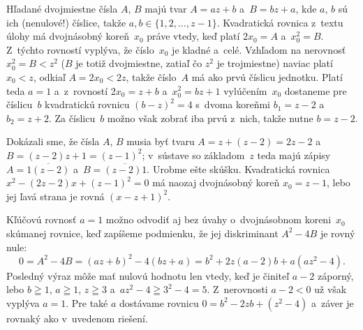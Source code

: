 {%
Hľadané dvojmiestne čísla $A$, $B$ majú tvar $A=az+b$ a~$B=bz+a$,
kde $a$, $b$ sú ich (nenulové!) číslice, takže
$a,b\in\{1,2,\dots,z-1\}$. Kvadratická rovnica z~textu úlohy má
dvojnásobný koreň~$x_0$ práve vtedy, keď platí $2x_0=A$ a~$x_0^2=B$.
Z~týchto rovností vyplýva, že číslo~$x_0$ je kladné a~celé.
Vzhľadom na nerovnosť $x_0^2=B<z^2$ ($B$ je totiž dvojmiestne,
zatiaľ čo $z^2$ je trojmiestne) naviac platí $x_0<z$, odkiaľ
$A=2x_0<2z$, takže číslo~$A$ má ako prvú číslicu jednotku.
Platí teda $a=1$ a~z~rovností $2x_0=z+b$ a~$x_0^2=bz+1$
vylúčením~$x_0$ dostaneme pre číslicu~$b$ kvadratickú rovnicu
$(b-z)^2=4$ s~dvoma koreňmi $b_1=z-2$ a~$b_2=z+2$. Za číslicu~$b$
možno však zobrať iba prvú z~nich, takže nutne $b=z-2$.

Dokázali sme, že čísla $A$, $B$ musia byť tvaru
$A=z+(z-2)=2z-2$ a~$B=({z-2})z+1=(z-1)^2$; v~sústave so základom~$z$
teda majú zápisy $A=\overline{1(z-2)}$ a~$B=\overline{(z-2)1}$.
Urobme ešte skúšku. Kvadratická rovnica
$x^2-(2z-2)x+(z-1)^2=0$ má naozaj dvojnásobný koreň $x_0=z-1$,
lebo jej ľavá strana je rovná $(x-z+1)^2$.

\poznamka
Kľúčovú rovnosť $a=1$ možno odvodiť aj bez úvahy 
o~dvojnásobnom koreni~$x_0$ skúmanej rovnice, keď zapíšeme
podmienku, že jej diskriminant $A^2-4B$ je rovný nule:
$$
0=A^2-4B=(az+b)^2-4(bz+a)=b^2+2z(a-2)b+a(az^2-4).
$$
Posledný výraz môže mať nulovú hodnotu len vtedy, keď je činiteľ
$a-2$ záporný, lebo $b\geqq1$, $a\geqq1$, $z\geqq3$ 
a~$az^2-4\geqq3^2-4=5$. Z~nerovnosti $a-2<0$ už však vyplýva
$a=1$. Pre také $a$ dostávame rovnicu $0=b^2-2zb+(z^2-4)$ 
a~záver je rovnaký ako v~uvedenom riešení.}

